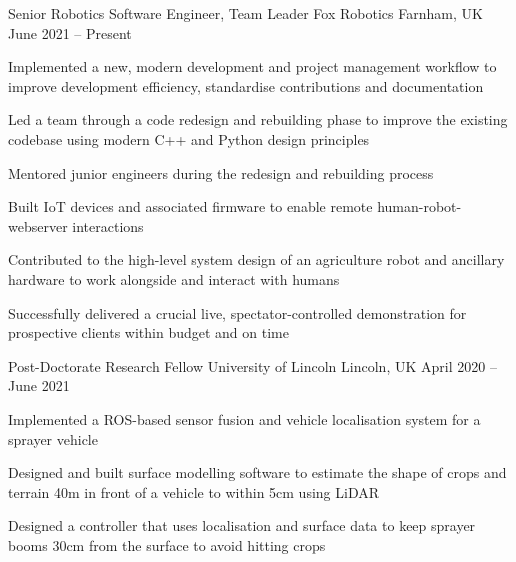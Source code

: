 \documentclass[11pt,a4paper]{awesome-cv}        %
\begin{document}
\makecvheader



\begin{cventries}
  \cventry
  {Senior Robotics Software Engineer, Team Leader}
  {Fox Robotics}
  {Farnham, UK}
  {June 2021 -- Present}
  {
    \begin{cvitems}
      \item Implemented a new, modern development and project management workflow to improve development efficiency, standardise contributions and documentation
      \item Led a team through a code redesign and rebuilding phase to improve the existing codebase using modern C++ and Python design principles
      \item Mentored junior engineers during the redesign and rebuilding process
      \item Built IoT devices and associated firmware to enable remote human-robot-webserver interactions
      \item Contributed to the high-level system design of an agriculture robot and ancillary hardware to work alongside and interact with humans
      \item Successfully delivered a crucial live, spectator-controlled demonstration for prospective clients within budget and on time
    \end{cvitems}
  }
  \cventry
  {Post-Doctorate Research Fellow}
  {University of Lincoln}
  {Lincoln, UK}
  {April 2020 -- June 2021}
  {
    \begin{cvitems}
      \item Implemented a ROS-based sensor fusion and vehicle localisation system for a sprayer vehicle
      \item Designed and built surface modelling software to estimate the shape of crops and terrain 40m in front of a vehicle to within 5cm using LiDAR
      \item Designed a controller that uses localisation and surface data to keep sprayer booms 30cm from the surface to avoid hitting crops
    \end{cvitems}
  }

\end{cventries}
\end{document}
